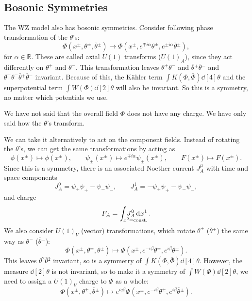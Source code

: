 \subsection*{Bosonic Symmetries}%

The WZ model also has bosonic symmetries. Consider following phase transformation of the $\theta$'s:
\begin{equation}
  \Phi(x^{\pm}, \theta^{\pm}, \overline{\theta}{}^{\pm}) \mapsto \Phi(x^{\pm}, e^{\mp i \alpha} \theta^{\pm}, e^{\pm i \alpha} \overline{\theta}{}^{\pm}),
\end{equation}
for $\alpha \in \mathbb{R}$.
These are called axial $U(1)$ transforms ($U(1)_A$), since they act differently on $\theta^+$ and $\theta^-$.
This transformation leaves $\theta^+ \theta^-$ and $\overline{\theta}{}^+ \overline{\theta}{}^-$ and $\theta ^+ \theta^- \overline{\theta}{}^+ \overline{\theta}{}^-$ invariant. Because of this, the Kähler term $\int K(\Phi, \overline{\Phi}{}) \dd[4]{\theta}$ and the superpotential term $\int W(\Phi) \dd[2]{\theta}$ will also be invariant.
So this is a symmetry, no matter which potentials we use.
\begin{remark}
  We have not said that the overall field $\Phi$ does not have any charge. We have only said how the $\theta$'s transform.
\end{remark}
We can take it alternatively to act on the component fields.
Instead of rotating the $\theta$'s, we can get the same transformations by acting as
\begin{equation}
  \phi (x^{\pm}) \mapsto \phi(x^{\pm}), \qquad \psi_{\pm} (x^{\pm}) \mapsto e^{\mp i \alpha} \psi_{\pm} (x^{\pm}), \qquad F(x^{\pm}) \mapsto F(x^{\pm}).
\end{equation}
Since this is a symmetry, there is an associated Noether current $J^{\mu}_A$ with time and space components
\begin{equation}
  J^0_A = \overline{\psi}{}_+ \psi_+ - \overline{\psi}{}_- \psi_-, \qquad
  J^1_A = -\overline{\psi}{}_+ \psi_+ - \overline{\psi}{}_- \psi_-,
\end{equation}
and charge
\begin{equation}
  F_A = \int_{\mathrlap{x^0 = \text{const.}}} \; J_A^0 \dd[]{x^1}.
\end{equation}
We also consider $U(1)_V$ (vector) transformations, which rotate $\theta^+$ ($\overline{\theta}{}^+$) the same way as $\theta^-$ ($\overline{\theta}{}^-$):
\begin{equation}
  \Phi(x^{\pm}, \theta^{\pm}, \overline{\theta}{}^{\pm}) \mapsto \Phi(x^{\pm}, e^{-i \beta} \theta^{\pm}, e^{i \beta} \overline{\theta}{}^{\pm}).
\end{equation}
This leaves $\theta^2 \overline{\theta}{}^2$ invariant, so is a symmetry of $\int K(\Phi, \overline{\Phi}{}) \dd[4]{\theta}$. However, the measure $\dd[2]{\theta}$ is not invariant, so to make it a symmetry of $\int W(\Phi) \dd[2]{\theta}$, we need to assign a $U(1)_V$ charge to $\Phi$ as a whole:
\begin{equation}
  \Phi(x^{\pm}, \theta^{\pm}, \overline{\theta}{}^{\pm}) \mapsto e^{i q \beta} \Phi(x^{\pm}, e^{-i \beta} \theta^{\pm}, e^{i \beta} \overline{\theta}{}^{\pm}).
\end{equation}

